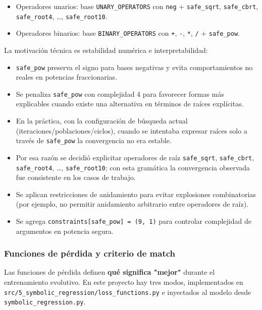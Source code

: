 \documentclass[12pt]{article}
\begin{document}
\begin{itemize}[leftmargin=1.5em]
    \item Operadores unarios:
    base \texttt{UNARY\_OPERATORS} con \texttt{neg} +
    \texttt{safe\_sqrt}, \texttt{safe\_cbrt}, \texttt{safe\_root4}, \ldots, \texttt{safe\_root10}.
    \item Operadores binarios:
    base \texttt{BINARY\_OPERATORS} con \texttt{+}, \texttt{-}, \texttt{*}, \texttt{/} + \texttt{safe\_pow}.
\end{itemize}

La motivación técnica es estabilidad numérica e interpretabilidad:
\begin{itemize}[leftmargin=1.5em]
    \item \texttt{safe\_pow} preserva el signo para bases negativas y evita comportamientos no reales en potencias fraccionarias.
    \item Se penaliza \texttt{safe\_pow} con complejidad 4 para favorecer formas más explicables cuando existe una alternativa en términos de raíces explícitas.
    \item En la práctica, con la configuración de búsqueda actual (iteraciones/poblaciones/ciclos), cuando se intentaba expresar raíces solo a través de \texttt{safe\_pow} la convergencia no era estable.
    \item Por esa razón se decidió explicitar operadores de raíz \texttt{safe\_sqrt}, \texttt{safe\_cbrt}, \texttt{safe\_root4}, \ldots, \texttt{safe\_root10}; con esta gramática la convergencia observada fue consistente en los casos de trabajo.
    \item Se aplican restricciones de anidamiento para evitar explosiones combinatorias (por ejemplo, no permitir anidamiento arbitrario entre operadores de raíz).
    \item Se agrega \texttt{constraints[safe\_pow] = (9, 1)} para controlar complejidad de argumentos en potencia segura.
\end{itemize}

\subsubsection*{Funciones de pérdida y criterio de match}
Las funciones de pérdida definen \textbf{qué significa "mejor"} durante el entrenamiento evolutivo. En este proyecto hay tres modos, implementados en \texttt{src/5\_symbolic\_regression/loss\_functions.py} e inyectados al modelo desde \texttt{symbolic\_regression.py}.
\end{document}
